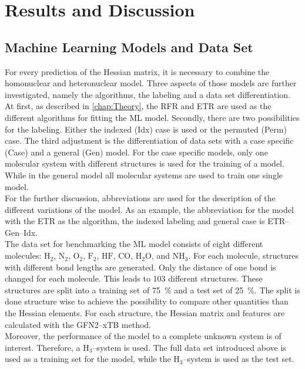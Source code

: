 \chapter{Results and Discussion}
\section{Machine Learning Models and Data Set}
For every prediction of the Hessian matrix,
it is necessary to combine the homonuclear and heteronuclear model.
Three aspects of those models are further investigated,
namely the algorithms, the labeling and a data set differentiation.\\
At first, as described in \autoref{chap:Theory},
the RFR and ETR are used as the different algorithms for fitting the ML model.
Secondly, there are two possibilities for the labeling.
Either the indexed (Idx) case is used or the permuted (Perm) case.
The third adjustment is the differentiation of data sets with a case specific (Case) and a general (Gen) model.
For the case specific models, only one molecular system with different structures is used for the training of a model.
While in the general model all molecular systems are used to train one single model.\\
For the further discussion, abbreviations are used for the description of the different variations of the model.
As an example, the abbreviation for the model with the ETR as the algorithm, the indexed labeling and general case is \mbox{ETR--Gen--Idx}.\\
The data set for benchmarking the ML model consists of eight different molecules:
$\mathrm{H}_2$, $\mathrm{N}_2$, $\mathrm{O}_2$, $\mathrm{F}_2$, $\mathrm{HF}$, $\mathrm{CO}$,
$\mathrm{H}_2\mathrm{O}$, and $\mathrm{NH}_3$.
For each molecule, structures with different bond lengths are generated.
Only the distance of one bond is changed for each molecule.
This leads to 103 different structures. These structures are split into a training set of 75~\% and a test set of 25~\%.
The split is done structure wise to achieve the possibility to compare other quantities than the Hessian elements.
For each structure, the Hessian matrix and features are calculated with the \mbox{GFN2--xTB} method.\\
Moreover, the performance of the model to a complete unknown system is of interest.
Therefore, a H$_3$--system is used.
The full data set introduced above is used as a training set for the model,
while the H$_3$--system is used as the test set.
\newpage
